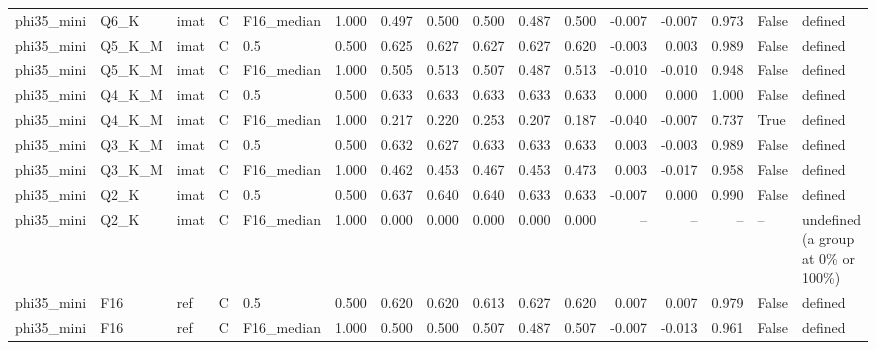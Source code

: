 \begin{tabular}{lllllrrrrrrrrrll}
phi35\_mini & Q6\_K & imat & C & F16\_median & 1.000 & 0.497 & 0.500 & 0.500 & 0.487 & 0.500 & -0.007 & -0.007 & 0.973 & False & defined \\
phi35\_mini & Q5\_K\_M & imat & C & 0.5 & 0.500 & 0.625 & 0.627 & 0.627 & 0.627 & 0.620 & -0.003 & 0.003 & 0.989 & False & defined \\
phi35\_mini & Q5\_K\_M & imat & C & F16\_median & 1.000 & 0.505 & 0.513 & 0.507 & 0.487 & 0.513 & -0.010 & -0.010 & 0.948 & False & defined \\
phi35\_mini & Q4\_K\_M & imat & C & 0.5 & 0.500 & 0.633 & 0.633 & 0.633 & 0.633 & 0.633 & 0.000 & 0.000 & 1.000 & False & defined \\
phi35\_mini & Q4\_K\_M & imat & C & F16\_median & 1.000 & 0.217 & 0.220 & 0.253 & 0.207 & 0.187 & -0.040 & -0.007 & 0.737 & True & defined \\
phi35\_mini & Q3\_K\_M & imat & C & 0.5 & 0.500 & 0.632 & 0.627 & 0.633 & 0.633 & 0.633 & 0.003 & -0.003 & 0.989 & False & defined \\
phi35\_mini & Q3\_K\_M & imat & C & F16\_median & 1.000 & 0.462 & 0.453 & 0.467 & 0.453 & 0.473 & 0.003 & -0.017 & 0.958 & False & defined \\
phi35\_mini & Q2\_K & imat & C & 0.5 & 0.500 & 0.637 & 0.640 & 0.640 & 0.633 & 0.633 & -0.007 & 0.000 & 0.990 & False & defined \\
phi35\_mini & Q2\_K & imat & C & F16\_median & 1.000 & 0.000 & 0.000 & 0.000 & 0.000 & 0.000 & -- & -- & -- & -- & undefined (a group at 0\% or 100\%) \\
phi35\_mini & F16 & ref & C & 0.5 & 0.500 & 0.620 & 0.620 & 0.613 & 0.627 & 0.620 & 0.007 & 0.007 & 0.979 & False & defined \\
phi35\_mini & F16 & ref & C & F16\_median & 1.000 & 0.500 & 0.500 & 0.507 & 0.487 & 0.507 & -0.007 & -0.013 & 0.961 & False & defined \\
\bottomrule
\end{tabular}
